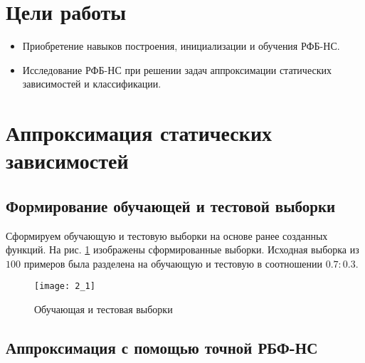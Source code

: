 





\tableofcontents
\newpage
\listoftables
\listoffigures
\newpage

\section{Цели работы}

\begin{itemize}
	\item Приобретение навыков построения, инициализации и обучения РФБ-НС.
	\item Исследование РФБ-НС при решении задач аппроксимации статических зависимостей и классификации.
\end{itemize}

\section{Аппроксимация статических зависимостей}

\subsection{Формирование обучающей и тестовой выборки}


Сформируем обучающую и тестовую выборки на основе ранее созданных функций. На рис. \ref{fig:2_1} изображены сформированные выборки. Исходная выборка из $100$ примеров была разделена на обучающую и тестовую в соотношении $0.7 : 0.3$.

\begin{figure}[H]
\begin{center}
	\texttt{[image: 2\_1]}
	\caption{Обучающая и тестовая выборки}
	\label{fig:2_1}
\end{center}
\end{figure}

\subsection{Аппроксимация с помощью точной РБФ-НС}


